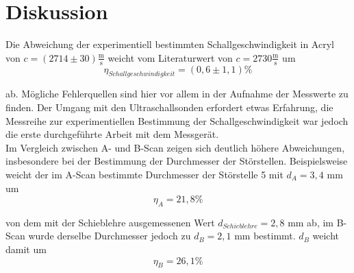 \section{Diskussion}
\label{sec:Diskussion}


Die Abweichung der experimentiell bestimmten Schallgeschwindigkeit in Acryl von $c = (2714 \pm 30) \mathrm{\frac{m}{s}}$ weicht vom Literaturwert von $c = 2730 \mathrm{\frac{m}{s}}$ um
\begin{equation*}
\eta_{Schallgeschwindigkeit} = (0,6 \pm 1,1) \%
\end{equation*}

ab. Mögliche Fehlerquellen sind hier vor allem in der Aufnahme der Messwerte zu finden. 
Der Umgang mit den Ultraschallsonden erfordert etwas Erfahrung, die Messreihe zur experimentiellen Bestimmung der Schallgeschwindigkeit
war jedoch die erste durchgeführte Arbeit mit dem Messgerät.\\

Im Vergleich zwischen A- und B-Scan zeigen sich deutlich höhere Abweichungen, insbesondere bei der Bestimmung der Durchmesser der 
Störstellen. Beispielsweise weicht der im A-Scan bestimmte Durchmesser der Störstelle 5 mit $d_A = 3,4$ mm um 
\begin{equation*}
  \eta_A = 21,8 \%
\end{equation*}

von dem mit der 
Schieblehre ausgemessenen Wert $d_{Schieblehre} = 2,8$ mm ab, im B-Scan wurde derselbe Durchmesser jedoch zu $d_B = 2,1$ mm bestimmt. $d_B$ weicht damit 
um 
\begin{equation*}
  \eta_B = 26,1 \%
\end{equation*}

